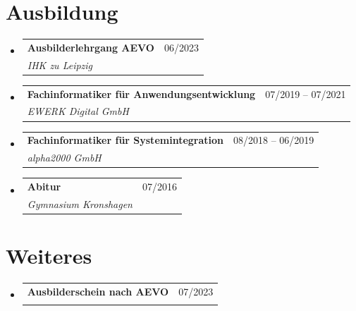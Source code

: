 \documentclass[a4paper,11pt]{article}
\makeatletter
\newcommand{\resumeSubheading}[4]{
  \vspace{-2pt}\item
    \begin{tabular*}{0.97\textwidth}[t]{l@{\extracolsep{\fill}}r}
      \textbf{#1} & #2 \\
      \textit{\small#3} & \textit{\small #4} \\
    \end{tabular*}\vspace{-7pt}
}
\newcommand{\resumeSubHeadingListStart}{\begin{itemize}[leftmargin=0.15in, label={}]}
\newcommand{\resumeSubHeadingListEnd}{\end{itemize}}
\makeatother
\begin{document}
\section{Ausbildung}
  \resumeSubHeadingListStart
    \resumeSubheading
      {Ausbilderlehrgang AEVO}{06/2023}
      {IHK zu Leipzig}{}
    \resumeSubheading
      {Fachinformatiker für Anwendungsentwicklung}{07/2019 -- 07/2021}
      {EWERK Digital GmbH}{}
    \resumeSubheading
      {Fachinformatiker für Systemintegration}{08/2018 -- 06/2019}
      {alpha2000 GmbH}{}
    \resumeSubheading
      {Abitur}{07/2016}
      {Gymnasium Kronshagen}{}
  \resumeSubHeadingListEnd


\section{Weiteres}
  \resumeSubHeadingListStart
    \resumeSubheading
      {Ausbilderschein nach AEVO}{07/2023}
      {}{}
  \resumeSubHeadingListEnd


\end{document}
